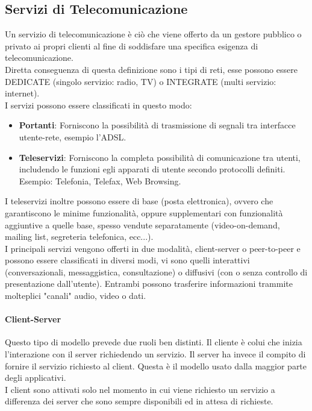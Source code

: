 \documentclass[12pt]{article}
\begin{document}
\subsection{Servizi di Telecomunicazione}
Un servizio di telecomunicazione è ciò che viene offerto da un gestore pubblico o privato ai propri clienti al fine di soddisfare una specifica esigenza di telecomunicazione.\\
Diretta conseguenza di questa definizione sono i tipi di reti, esse possono essere DEDICATE (singolo servizio: radio, TV) o INTEGRATE (multi servizio: internet).\\
I servizi possono essere classificati in questo modo:
\begin{itemize}
  \item \textbf{Portanti}: Forniscono la possibilità di trasmissione di segnali tra interfacce utente-rete, esempio l'ADSL.
  \item \textbf{Teleservizi}: Forniscono la completa possibilità di comunicazione tra utenti, includendo le funzioni egli apparati di utente secondo protocolli definiti. Esempio: Telefonia, Telefax, Web Browsing.
\end{itemize}
I teleservizi inoltre possono essere di base (posta elettronica), ovvero che garantiscono le minime funzionalità, oppure supplementari con funzionalità aggiuntive a quelle base, spesso vendute separatamente (video-on-demand, mailing list, segreteria telefonica, ecc...).\\
I principali servizi vengono offerti in due modalità, client-server o peer-to-peer e possono essere classificati in diversi modi, vi sono quelli interattivi (conversazionali, messaggistica, consultazione) o diffusivi (con o senza controllo di presentazione dall'utente). Entrambi possono trasferire informazioni trammite molteplici "canali" audio, video o dati.

\paragraph{Client-Server}
Questo tipo di modello prevede due ruoli ben distinti. Il cliente è colui che inizia l'interazione con il server richiedendo un servizio. Il server ha invece il compito di fornire il servizio richiesto al client. Questa è il modello usato dalla maggior parte degli applicativi.\\
I client sono attivati solo nel momento in cui viene richiesto un servizio a differenza dei server che sono sempre disponibili ed in attesa di richieste.
\end{document}
